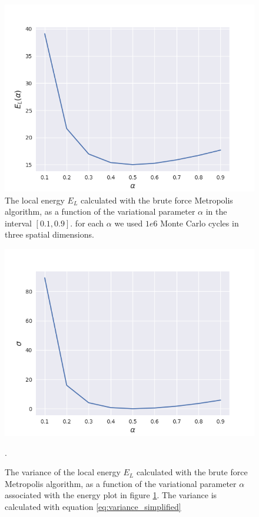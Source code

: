 \documentclass[norsk,a4paper,12pt]{article}
\begin{document}
\begin{figure} [H]
	\centering
	\includegraphics[scale=0.6]{images/energy.png}
	\caption{The local energy $E_L$ calculated with the brute force Metropolis algorithm, as a function of the variational parameter $\alpha$ in the interval $[0.1,0.9]$. for each $\alpha$ we used $1e6$ Monte Carlo cycles in three spatial dimensions.}
	\label{fig:EL_as_func_of_alpha}
\end{figure} 

\begin{figure} [H]
	\centering
	\includegraphics[scale=0.6]{images/variance.png}
	\caption{The variance of the local energy $E_L$ calculated with the brute force Metropolis algorithm, as a function of the variational parameter $\alpha$ associated with the energy plot in figure \ref{fig:EL_as_func_of_alpha}. The variance is calculated with equation \ref{eq:variance_simplified}}.
	\label{fig:variance_EL_as_func_of_alpha}
\end{figure} 
\end{document}
